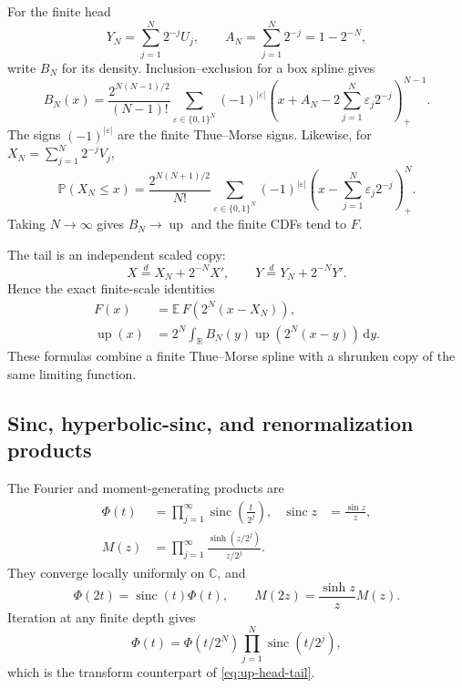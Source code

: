 \documentclass[11pt,oneside]{article}
\theoremstyle{definition}
\theoremstyle{remark}
\newcommand{\R}{\mathbb R}
\newcommand{\C}{\mathbb C}
\newcommand{\E}{\mathbb E}
\newcommand{\Prob}{\mathbb P}
\newcommand{\Up}{\operatorname{up}}
\newcommand{\sinc}{\operatorname{sinc}}
\newcommand{\dd}{\,\mathrm d}
\begin{document}
For the finite head
\[
 Y_N=\sum_{j=1}^N2^{-j}U_j,
 \qquad A_N=\sum_{j=1}^N2^{-j}=1-2^{-N},
\]
write $B_N$ for its density.  Inclusion--exclusion for a box spline gives
\begin{equation}\label{eq:BN-truncated-power}
 B_N(x)=\frac{2^{N(N-1)/2}}{(N-1)!}
 \sum_{\varepsilon\in\{0,1\}^N}(-1)^{|\varepsilon|}
 \left(x+A_N-2\sum_{j=1}^N\varepsilon_j2^{-j}\right)_+^{N-1}.
\end{equation}
The signs $(-1)^{|\varepsilon|}$ are the finite Thue--Morse signs.  Likewise,
for $X_N=\sum_{j=1}^N2^{-j}V_j$,
\begin{equation}\label{eq:FN-truncated-power}
 \Prob(X_N\le x)=\frac{2^{N(N+1)/2}}{N!}
 \sum_{\varepsilon\in\{0,1\}^N}(-1)^{|\varepsilon|}
 \left(x-\sum_{j=1}^N\varepsilon_j2^{-j}\right)_+^N.
\end{equation}
Taking $N\to\infty$ gives $B_N\to\Up$ and the finite CDFs tend to $F$.

The tail is an independent scaled copy:
\begin{equation}\label{eq:head-tail}
 X\overset d=X_N+2^{-N}X',\qquad
 Y\overset d=Y_N+2^{-N}Y'.
\end{equation}
Hence the exact finite-scale identities
\begin{align}
 F(x)&=\E\,F\!\left(2^N(x-X_N)\right),\label{eq:F-head-tail}\\
 \Up(x)&=2^N\int_\R B_N(y)\Up\!\left(2^N(x-y)\right)\dd y.\label{eq:up-head-tail}
\end{align}
These formulas combine a finite Thue--Morse spline with a shrunken copy of the
same limiting function.

\subsection{Sinc, hyperbolic-sinc, and renormalization products}

The Fourier and moment-generating products are
\begin{align}
 \Phi(t)&=\prod_{j=1}^\infty\sinc\!\left(\frac{t}{2^j}\right),
 &\sinc z&=\frac{\sin z}{z},\label{eq:Phi-sinc-product}\\
 M(z)&=\prod_{j=1}^\infty\frac{\sinh(z/2^j)}{z/2^j}.
 \label{eq:M-sinh-product}
\end{align}
They converge locally uniformly on $\C$, and
\begin{equation}\label{eq:renormalization-products}
 \Phi(2t)=\sinc(t)\Phi(t),\qquad
 M(2z)=\frac{\sinh z}{z}M(z).
\end{equation}
Iteration at any finite depth gives
\begin{equation}\label{eq:finite-tail-product}
 \Phi(t)=\Phi(t/2^N)\prod_{j=1}^N\sinc(t/2^j),
\end{equation}
which is the transform counterpart of \eqref{eq:up-head-tail}.
\end{document}
